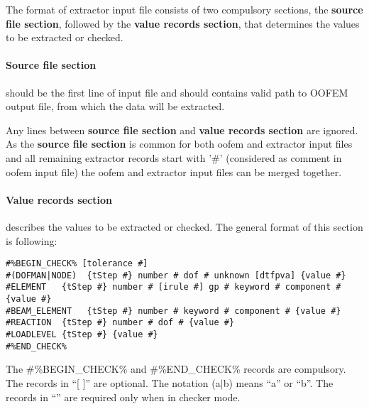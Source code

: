 \documentclass[a4paper]{article}
\newcommand{\excommand}[1]{#1}
\begin{document}
The format
of extractor input file consists of two compulsory sections, the {\bf source file
section}, followed by the {\bf value records section}, that determines the values to be extracted or checked.

\paragraph{Source file section} should be the first line of input file and
should contains valid path to OOFEM output file, from which
the data will be extracted.

Any lines between {\bf source file
section} and {\bf value records section} are
ignored. As the {\bf source file
section} is common for both oofem and extractor input files and all remaining extractor records start with '\#' (considered as comment in oofem input file) the oofem and extractor  input files can be merged together.


\paragraph{Value records section} describes the values to be extracted or checked. The general format of this section is following:
\begin{verbatim}
#%BEGIN_CHECK% [tolerance #]
#(DOFMAN|NODE)  {tStep #} number # dof # unknown [dtfpva] {value #}
#ELEMENT   {tStep #} number # [irule #] gp # keyword # component # {value #}
#BEAM_ELEMENT   {tStep #} number # keyword # component # {value #}
#REACTION  {tStep #} number # dof # {value #}
#LOADLEVEL {tStep #} {value #}
#%END_CHECK%
\end{verbatim}
The \#\%\excommand{BEGIN\_CHECK}\% and \#\%\excommand{END\_CHECK}\% records are compulsory.
The records in ``[ ]'' are optional. The notation (a$|$b) means ``a'' or ``b''.
The records in ``{}'' are required only when in checker mode.
\end{document}
